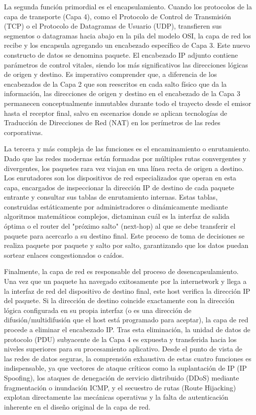 \documentclass[a4paper,12pt]{article}
\begin{document}
La segunda función primordial es el encapsulamiento. Cuando los protocolos de la capa de transporte (Capa 4), como el Protocolo de Control de Transmisión (TCP) o el Protocolo de Datagramas de Usuario (UDP), transfieren sus segmentos o datagramas hacia abajo en la pila del modelo OSI, la capa de red los recibe y los encapsula agregando un encabezado específico de Capa 3. Este nuevo constructo de datos se denomina paquete. El encabezado IP adjunto contiene parámetros de control vitales, siendo los más significativos las direcciones lógicas de origen y destino. Es imperativo comprender que, a diferencia de los encabezados de la Capa 2 que son reescritos en cada salto físico que da la información, las direcciones de origen y destino en el encabezado de la Capa 3 permanecen conceptualmente inmutables durante todo el trayecto desde el emisor hasta el receptor final, salvo en escenarios donde se aplican tecnologías de Traducción de Direcciones de Red (NAT) en los perímetros de las redes corporativas.

La tercera y más compleja de las funciones es el encaminamiento o enrutamiento. Dado que las redes modernas están formadas por múltiples rutas convergentes y divergentes, los paquetes rara vez viajan en una línea recta de origen a destino. Los enrutadores son los dispositivos de red especializados que operan en esta capa, encargados de inspeccionar la dirección IP de destino de cada paquete entrante y consultar sus tablas de enrutamiento internas. Estas tablas, construidas estáticamente por administradores o dinámicamente mediante algoritmos matemáticos complejos, dictaminan cuál es la interfaz de salida óptima o el router del "próximo salto" (next-hop) al que se debe transferir el paquete para acercarlo a su destino final. Este proceso de toma de decisiones se realiza paquete por paquete y salto por salto, garantizando que los datos puedan sortear enlaces congestionados o caídos.

Finalmente, la capa de red es responsable del proceso de desencapsulamiento. Una vez que un paquete ha navegado exitosamente por la internetwork y llega a la interfaz de red del dispositivo de destino final, este host verifica la dirección IP del paquete. Si la dirección de destino coincide exactamente con la dirección lógica configurada en su propia interfaz (o es una dirección de difusión/multidifusión que el host está programado para aceptar), la capa de red procede a eliminar el encabezado IP. Tras esta eliminación, la unidad de datos de protocolo (PDU) subyacente de la Capa 4 es expuesta y transferida hacia los niveles superiores para su procesamiento aplicativo. Desde el punto de vista de las redes de datos seguras, la comprensión exhaustiva de estas cuatro funciones es indispensable, ya que vectores de ataque críticos como la suplantación de IP (IP Spoofing), los ataques de denegación de servicio distribuido (DDoS) mediante fragmentación o inundación ICMP, y el secuestro de rutas (Route Hijacking) explotan directamente las mecánicas operativas y la falta de autenticación inherente en el diseño original de la capa de red.
\end{document}
